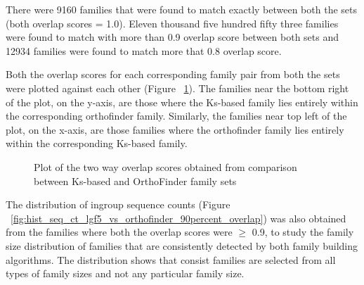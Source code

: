 \documentclass{article}
\begin{document}
		There were 9160 families that were found to match exactly between both the sets (both overlap scores = 1.0). Eleven thousand five hundred fifty three families were found to match with more than 0.9 overlap score between both sets and 12934 families were found to match more that 0.8 overlap score.
		
		Both the overlap scores for each corresponding family pair from both the sets were plotted against each other (Figure ~\ref{fig:scatter_lgf5_vs_orthofinder_overlap_lgf5}). The families near the bottom right of the plot, on the y-axis, are those where the Ks-based family lies entirely within the corresponding orthofinder family. Similarly, the families near top left of the plot, on the x-axis,  are those families where the orthofinder family lies entirely within the corresponding Ks-based family.
		  
		\begin{figure}[h!]
			\caption{Plot of the two way overlap scores obtained from comparison between Ks-based and OrthoFinder family sets}
			\label{fig:scatter_lgf5_vs_orthofinder_overlap_lgf5}
		\end{figure}
		
		The distribution of ingroup sequence counts (Figure ~\ref{fig:hist_seq_ct_lgf5_vs_orthofinder_90percent_overlap}) was also obtained from the families where both the overlap scores were $\geq$ 0.9, to study the family size distribution of families that are consistently detected by both family building algorithms. The distribution shows that consist families are selected from all types of family sizes and not any particular family size.
		
\end{document}

